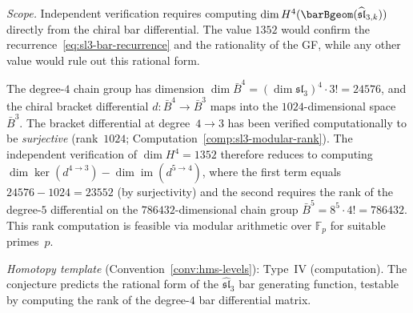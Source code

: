 \begin{conjecture}
\emph{Scope.}  Independent verification requires computing $\dim H^4(\barBgeom(\widehat{\mathfrak{sl}}_{3,k}))$ directly from the chiral bar differential.  The value $1352$ would confirm the recurrence~\eqref{eq:sl3-bar-recurrence} and the rationality of the GF, while any other value would rule out this rational form.

The degree-$4$ chain group has dimension $\dim \bar{B}^4 = (\dim\mathfrak{sl}_3)^4 \cdot 3! = 24576$, and the chiral bracket differential $d\colon \bar{B}^4 \to \bar{B}^3$ maps into the $1024$-dimensional space $\bar{B}^3$.  The bracket differential at degree~$4 \to 3$ has been verified computationally to be \emph{surjective} (rank~$1024$; Computation~\ref{comp:sl3-modular-rank}).  The independent verification of $\dim H^4 = 1352$ therefore reduces to computing $\dim\ker(d^{4 \to 3}) - \dim\operatorname{im}(d^{5 \to 4})$, where the first term equals $24576 - 1024 = 23552$ (by surjectivity) and the second requires the rank of the degree-$5$ differential on the $786432$-dimensional chain group $\bar{B}^5 = 8^5 \cdot 4! = 786432$.  This rank computation is feasible via modular arithmetic over $\mathbb{F}_p$ for suitable primes~$p$.
\end{conjecture}

\begin{remark}[Scope]
\emph{Homotopy template} (Convention~\ref{conv:hms-levels}): Type~IV (computation).
The conjecture predicts the rational form of the $\widehat{\mathfrak{sl}}_3$ bar generating function, testable by computing the rank of the degree-$4$ bar differential matrix.
\end{remark}

